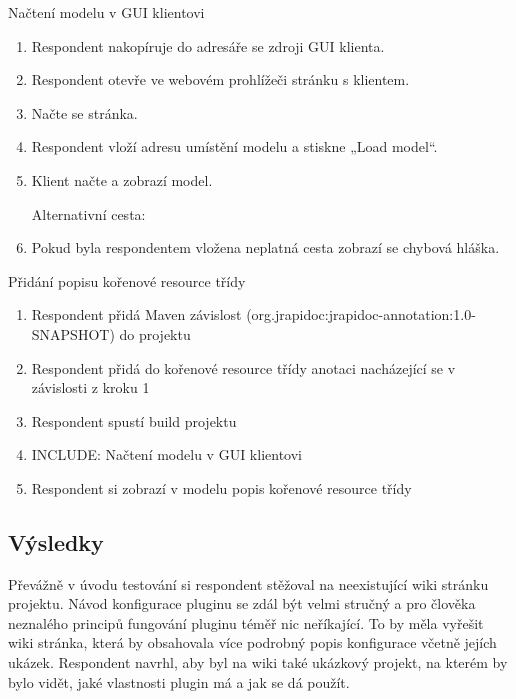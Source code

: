 \documentclass[11pt,twoside,a4paper]{book}
\begin{document}
Načtení modelu v GUI klientovi

\begin{enumerate}
  \item Respondent nakopíruje do adresáře se zdroji GUI klienta.
  
  \item Respondent otevře ve webovém prohlížeči stránku s klientem.
  
  \item Načte se stránka.
  
  \item Respondent vloží adresu umístění modelu a stiskne „Load model“.
  
  \item Klient načte a zobrazí model.
  
Alternativní cesta:

  \item Pokud byla respondentem vložena neplatná cesta zobrazí se chybová hláška.
\end{enumerate}

Přidání popisu kořenové resource třídy

\begin{enumerate}
  \item Respondent přidá Maven závislost (org.jrapidoc:jrapidoc-annotation:1.0-SNAPSHOT)
do projektu
  \item Respondent přidá do kořenové resource třídy anotaci nacházející se v závislosti z
kroku 1

  \item Respondent spustí build projektu
  \item INCLUDE: Načtení modelu v GUI klientovi

  \item Respondent si zobrazí v modelu popis kořenové resource třídy
\end{enumerate}

\subsection{Výsledky}

Převážně v úvodu testování si respondent stěžoval na neexistující wiki stránku projektu.
Návod konfigurace pluginu se zdál být velmi stručný a pro člověka neznalého principů
fungování pluginu téměř nic neříkající. To by měla vyřešit wiki stránka, která by obsahovala
více podrobný popis konfigurace včetně jejích ukázek. Respondent navrhl, aby byl na wiki
také ukázkový projekt, na kterém by bylo vidět, jaké vlastnosti plugin má a jak se dá použít.
\end{document}
